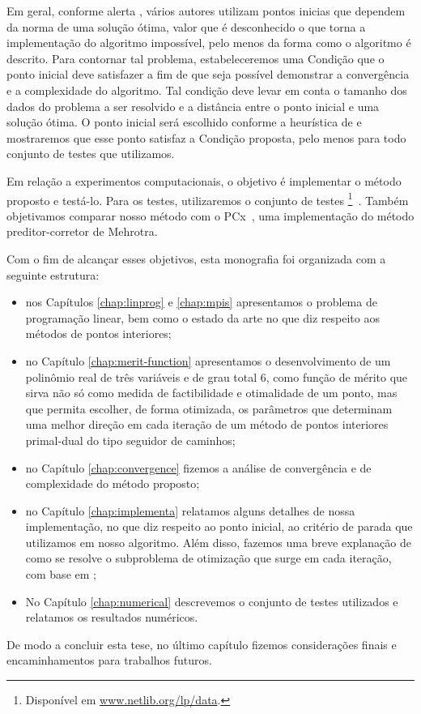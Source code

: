 Em geral, conforme alerta \textcite[p. 112]{Wright:Primal-dual-interior-point:1997h}, vários autores utilizam pontos inicias que dependem da norma de uma solução ótima, valor que é desconhecido o que torna a implementação do algoritmo impossível, pelo menos da forma como o algoritmo é descrito.  
 Para contornar tal problema,  estabeleceremos uma Condição que o ponto inicial deve satisfazer a fim de que seja possível demonstrar a convergência e a complexidade  do algoritmo. Tal condição deve levar  em conta o tamanho dos dados do problema a  ser  resolvido e a distância entre o ponto inicial e uma solução ótima.  O ponto inicial será escolhido conforme a heurística de \textcite{Mehrotra:1992wr} e mostraremos que esse ponto satisfaz a Condição proposta, pelo menos para todo conjunto de testes que utilizamos. 



Em relação a experimentos computacionais, o objetivo é implementar o método proposto e testá-lo. Para os testes, utilizaremos o conjunto de testes \Netlib\footnote{Disponível em \url{www.netlib.org/lp/data}.}~\cite{Dongarra:1987jk,Gay:1985ts}. Também objetivamos comparar nosso método com o PCx~\cite{Czyzyk:1999hk}, uma implementação do método preditor-corretor de Mehrotra. 



Com o fim de alcançar  esses objetivos, esta monografia foi organizada com a seguinte estrutura: 

\begin{itemize}

	\item nos Capítulos \ref{chap:linprog} e  \ref{chap:mpis} apresentamos o problema de programação linear, bem como o estado da arte no que diz respeito aos métodos de pontos interiores; 
\item no Capítulo \ref{chap:merit-function} apresentamos o
desenvolvimento de um polinômio real de três variáveis e de grau total 6, como função de mérito  que sirva não só como medida
de factibilidade e otimalidade de um ponto, mas que permita escolher, de forma
otimizada, os parâmetros que determinam uma melhor direção em cada iteração
de um método de pontos interiores primal-dual do tipo seguidor de caminhos; 
\item no Capítulo \ref{chap:convergence} fizemos a análise de convergência e de complexidade do método proposto; 
\item no Capítulo \ref{chap:implementa}  relatamos alguns detalhes de nossa implementação, no que diz respeito  ao ponto inicial, ao critério de parada que utilizamos em nosso algoritmo. Além disso, fazemos uma breve explanação de como se resolve o subproblema de otimização que surge em cada iteração, com base em \cite{VillasBoas2013:wn,VillasBoas:2003tg,VillasBoas:2012ur};

\item No Capítulo  \ref{chap:numerical}  descrevemos o conjunto de testes utilizados e relatamos os resultados  numéricos.


\end{itemize}

 De modo a  concluir esta tese, no último capítulo fizemos considerações finais e encaminhamentos para trabalhos futuros.


